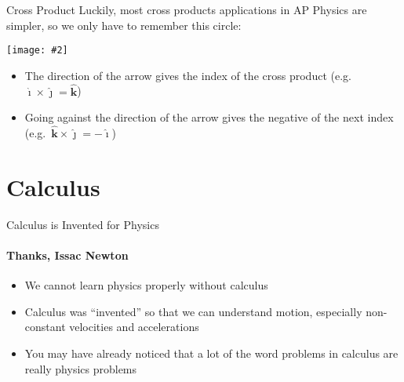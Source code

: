 \documentclass[12pt,compress,aspectratio=169]{beamer}
\newcommand{\pic}[2]{\texttt{[image: \#2]}}
\begin{document}
\begin{frame}{Cross Product}
  Luckily, most cross products applications in AP Physics are simpler, so we
  only have to remember this circle:
  \begin{center}
    \vspace{-.2in}\pic{.12}{cross-product-circle.png}
  \end{center}
  \begin{itemize}
  \item The direction of the arrow gives the index of the cross product
    (e.g.\ $\bm{\hat{\imath}}\times\bm{\hat{\jmath}}=\bm{\hat{k}}$)
  \item Going against the direction of the arrow gives the negative of the next
    index (e.g.\ $\bm{\hat{k}}\times\bm{\hat{\jmath}}=-\bm{\hat{\imath}}$)
  \end{itemize}
\end{frame}


\section{Calculus}

\begin{frame}{Calculus is Invented for Physics}
  \framesubtitle{Thanks, Issac Newton}
  \begin{itemize}
  \item We cannot learn physics properly without calculus %
  \item Calculus was ``invented'' so that we can understand motion, especially
    non-constant velocities and accelerations
  \item You may have already noticed that a lot of the word problems in
    calculus are really physics problems
  \end{itemize}
\end{frame}
\end{document}
